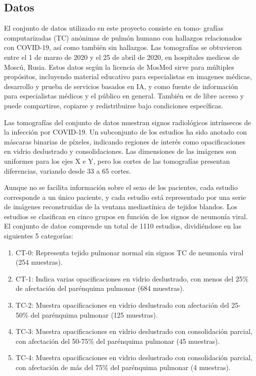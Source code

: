 \documentclass[10pt, oneside, a4paper]{article}
\begin{document}
	\subsection{Datos} \label{datos}
	
	El conjunto de datos \cite{mosmed} utilizado en este proyecto consiste en tomo-
	grafías computarizadas (TC) anónimas de pulmón humano con hallazgos relacionados con COVID-19, así como también sin hallazgos. Las tomografías se obtuvieron entre el 1 de marzo de 2020 y el 25 de abril de 2020, en hospitales medicos de Moscú, Rusia. Estos datos según la licencia de MosMed sirve para múltiples propósitos, incluyendo material educativo para especialistas en imagenes médicas, desarrollo y prueba de servicios basados en IA, y como fuente de información para especialistas médicos y el público en general. También es de libre acceso y puede compartirse, copiarse y redistribuirse bajo condiciones específicas.
	
	Las tomografías del conjunto de datos muestran signos radiológicos intrínsecos de la infección por COVID-19. Un subconjunto de los estudios ha sido anotado con máscaras binarias de píxeles, indicando regiones de interés como opacificaciones en vidrio deslustrado y consolidaciones. Las dimensiones de las imágenes son uniformes para los ejes X e Y, pero los cortes de las tomografías presentan diferencias, variando desde 33 a 65 cortes.
	
	Aunque no se facilita información sobre el sexo de los pacientes, cada estudio corresponde a un único paciente, y cada estudio está representado por una serie de imágenes reconstruidas de la ventana mediastínica de tejidos blandos. Los estudios se clasifican en cinco grupos en función de los signos de neumonía viral.
	El conjunto de datos comprende un total de 1110 estudios, dividiéndose en las siguientes 5 categorías:
	
	\begin{enumerate}
		\item CT-0: Representa tejido pulmonar normal sin signos TC de neumonía viral (254 muestras).
		\item CT-1: Indica varias opacificaciones en vidrio deslustrado, con menos del 25\% de afectación del parénquima pulmonar (684 muestras).
		\item TC-2: Muestra opacificaciones en vidrio deslustrado con afectación del 25-50\% del parénquima pulmonar (125 muestras).
		\item TC-3: Muestra opacificaciones en vidrio deslustrado con consolidación parcial, con afectación del 50-75\% del parénquima pulmonar (45 muestras).
		\item TC-4: Muestra opacificaciones en vidrio deslustrado con consolidación parcial, con afectación de más del 75\% del parénquima pulmonar (4 muestras).
		
	\end{enumerate}
	
\end{document}
